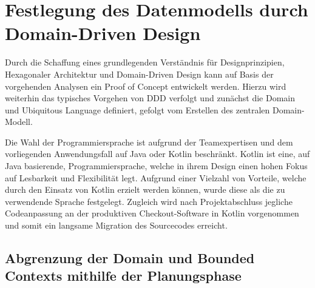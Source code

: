 

\chapter{Festlegung des Datenmodells durch Domain-Driven Design}

Durch die Schaffung eines grundlegenden Verständnis für Designprinzipien, Hexagonaler Architektur und Domain-Driven Design kann auf Basis der vorgehenden Analysen ein Proof of Concept entwickelt werden. Hierzu wird weiterhin das typisches Vorgehen von DDD verfolgt und zunächst die Domain und Ubiquitous Language definiert, gefolgt vom Erstellen des zentralen Domain-Modell. 

Die Wahl der Programmiersprache ist aufgrund der Teamexpertisen und dem vorliegenden Anwendungsfall auf Java oder Kotlin beschränkt. Kotlin ist eine, auf Java basierende, Programmiersprache, welche in ihrem Design einen hohen Fokus auf Lesbarkeit und Flexibilität legt. Aufgrund einer Vielzahl von Vorteile, welche durch den Einsatz von Kotlin erzielt werden können, wurde diese als die zu verwendende Sprache festgelegt. Zugleich wird nach Projektabschluss jegliche Codeanpassung an der produktiven Checkout-Software in Kotlin vorgenommen und somit ein langsame Migration des Sourcecodes erreicht.


\section{Abgrenzung der Domain und Bounded Contexts mithilfe der Planungsphase}

